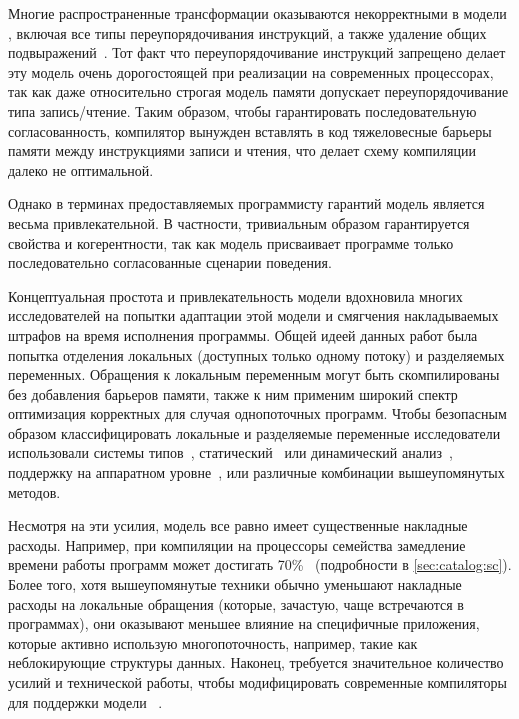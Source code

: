 Многие распространенные трансформации оказываются 
некорректными в модели \SC, включая 
все типы переупорядочивания инструкций, 
а также удаление общих подвыражений~\cite{Marino-al:PLDI11, Sevcik-Aspinall:ECOOP08}.
Тот факт что переупорядочивание инструкций запрещено 
делает эту модель очень дорогостоящей при реализации
на современных процессорах, так как даже 
относительно строгая модель памяти \Intel
допускает переупорядочивание типа запись/чтение. 
Таким образом, чтобы гарантировать последовательную согласованность, 
компилятор вынужден вставлять в код тяжеловесные 
барьеры памяти между инструкциями записи и чтения,
что делает схему компиляции далеко не оптимальной. 

Однако в терминах предоставляемых программисту гарантий 
модель \SC является весьма привлекательной. 
В частности, тривиальным образом гарантируется свойства \DRF и когерентности, 
так как модель присваивает программе только 
последовательно согласованные сценарии поведения. 

Концептуальная простота и привлекательность модели \SC 
вдохновила многих исследователей на попытки 
адаптации этой модели и смягчения накладываемых 
штрафов на время исполнения программы. 
Общей идеей данных работ была попытка 
отделения локальных (доступных только одному потоку) 
и разделяемых переменных.
Обращения к локальным переменным могут быть скомпилированы 
без добавления барьеров памяти, также к ним 
применим широкий спектр оптимизация корректных 
для случая однопоточных программ. 
Чтобы безопасным образом классифицировать 
локальные и разделяемые переменные исследователи 
использовали системы типов~\cite{Vollmer-al:PPoPP17},
статический~\cite{Singh-al:ISCA12} или динамический анализ~\cite{Liu-al:PLDI19}, 
поддержку на аппаратном уровне~\cite{Singh-al:ISCA12, Marino-al:PLDI10}, 
или различные комбинации вышеупомянутых методов.  

Несмотря на эти усилия, модель \SC все равно имеет существенные накладные расходы. 
Например, при компиляции на процессоры семейства 
замедление времени работы программ может достигать 70\%~\cite{Liu-al:PLDI19} 
(\see подробности в \cref{sec:catalog:sc}).
Более того, хотя вышеупомянутые техники обычно уменьшают 
накладные расходы на локальные обращения 
(которые, зачастую, чаще встречаются в программах),
они оказывают меньшее влияние на специфичные приложения, 
которые активно использую многопоточность, 
например, такие как неблокирующие структуры данных.
Наконец, требуется значительное количество усилий 
и технической работы, чтобы модифицировать 
современные компиляторы для поддержки модели \SC~\cite{Marino-al:PLDI11, Liu-al:PLDI19}.

